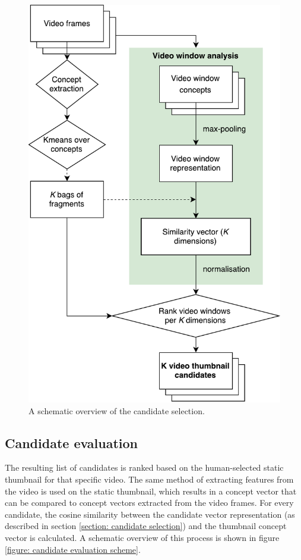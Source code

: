\documentclass{../resources/sig-alternate-05-2015}
\begin{document}
\begin{figure}[h]
	\centering
	\includegraphics[width=0.8\linewidth]{resources/candidate-selection}
	\caption{A schematic overview of the candidate selection.}
	\label{figure: candidate selection scheme}
\end{figure}

\subsection{Candidate evaluation}
\label{section: candidate evaluation}

The resulting list of candidates is ranked based on the human-selected static thumbnail for that specific video. The same method of extracting features from the video is used on the static thumbnail, which results in a concept vector that can be compared to concept vectors extracted from the video frames. For every candidate, the cosine similarity between the candidate vector representation (as described in section \ref{section: candidate selection}) and the thumbnail concept vector is calculated. A schematic overview of this process is shown in figure \ref{figure: candidate evaluation scheme}.
\end{document}
